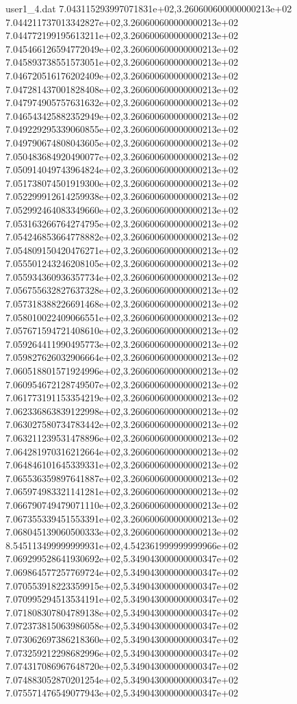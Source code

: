 \begin{filecontents}{user1_4.dat}
7.043115293997071831e+02,3.260600600000000213e+02
7.044211737013342827e+02,3.260600600000000213e+02
7.044772199195613211e+02,3.260600600000000213e+02
7.045466126594772049e+02,3.260600600000000213e+02
7.045893738551573051e+02,3.260600600000000213e+02
7.046720516176202409e+02,3.260600600000000213e+02
7.047281437001828408e+02,3.260600600000000213e+02
7.047974905757631632e+02,3.260600600000000213e+02
7.046543425882352949e+02,3.260600600000000213e+02
7.049229295339060855e+02,3.260600600000000213e+02
7.049790674808043605e+02,3.260600600000000213e+02
7.050483684920490077e+02,3.260600600000000213e+02
7.050914049743964824e+02,3.260600600000000213e+02
7.051738074501919300e+02,3.260600600000000213e+02
7.052299912614259938e+02,3.260600600000000213e+02
7.052992464083349660e+02,3.260600600000000213e+02
7.053163266764274795e+02,3.260600600000000213e+02
7.054246853664778882e+02,3.260600600000000213e+02
7.054809150420476271e+02,3.260600600000000213e+02
7.055501243246208105e+02,3.260600600000000213e+02
7.055934360936357734e+02,3.260600600000000213e+02
7.056755632827637328e+02,3.260600600000000213e+02
7.057318388226691468e+02,3.260600600000000213e+02
7.058010022409066551e+02,3.260600600000000213e+02
7.057671594721408610e+02,3.260600600000000213e+02
7.059264411990495773e+02,3.260600600000000213e+02
7.059827626032906664e+02,3.260600600000000213e+02
7.060518801571924996e+02,3.260600600000000213e+02
7.060954672128749507e+02,3.260600600000000213e+02
7.061773191153354219e+02,3.260600600000000213e+02
7.062336863839122998e+02,3.260600600000000213e+02
7.063027580734783442e+02,3.260600600000000213e+02
7.063211239531478896e+02,3.260600600000000213e+02
7.064281970316212664e+02,3.260600600000000213e+02
7.064846101645339331e+02,3.260600600000000213e+02
7.065536359897641887e+02,3.260600600000000213e+02
7.065974983321141281e+02,3.260600600000000213e+02
7.066790749479071110e+02,3.260600600000000213e+02
7.067355339451553391e+02,3.260600600000000213e+02
7.068045139060500333e+02,3.260600600000000213e+02
8.545113499999999931e+02,4.542361999999999966e+02
7.069299528641930692e+02,5.349043000000000347e+02
7.069864577257769724e+02,5.349043000000000347e+02
7.070553918223359915e+02,5.349043000000000347e+02
7.070995294513534191e+02,5.349043000000000347e+02
7.071808307804789138e+02,5.349043000000000347e+02
7.072373815063986058e+02,5.349043000000000347e+02
7.073062697386218360e+02,5.349043000000000347e+02
7.073259212298682996e+02,5.349043000000000347e+02
7.074317086967648720e+02,5.349043000000000347e+02
7.074883052870201254e+02,5.349043000000000347e+02
7.075571476549077943e+02,5.349043000000000347e+02

\end{filecontents}
